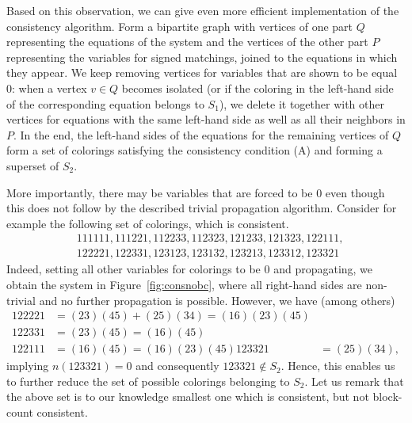 \documentclass[12pt,twoside,openright,a4paper]{book}
\begin{document}
Based on this observation, we can give even more efficient implementation of the consistency algorithm.
Form a bipartite graph with vertices of one part $Q$ representing the equations of the system
and the vertices of the other part $P$ representing the variables for signed matchings, joined
to the equations in which they appear.  We keep removing vertices for variables that are shown to be equal $0$:
when a vertex $v\in Q$ becomes isolated (or if the coloring in the left-hand side of the corresponding equation
belongs to $S_1$), we delete it together with other vertices for equations with the same left-hand side as well
as all their neighbors in $P$.  In the end, the left-hand sides of the equations for the remaining vertices of $Q$
form a set of colorings satisfying the consistency condition (A) and forming a superset of $S_2$.

More importantly, there may be variables that are forced to be $0$ even though this does not follow by the described
trivial propagation algorithm.  Consider for example the following set of colorings, which is consistent.
\begin{align*}
&111111,111221,112233,112323,121233,121323,122111,\\
&122221,122331,123123,123132,123213,123312,123321
\end{align*}
Indeed, setting all other variables for colorings to be $0$ and propagating, we obtain the system in Figure~\ref{fig:consnobc},
where all right-hand sides are non-trivial and no further propagation is possible.
However, we have (among others)
\begin{align*}
122221 &= (23)(45) + (25)(34) = (16)(23)(45)\\
122331 &= (23)(45) = (16)(45)\\
122111 &= (16)(45) = (16)(23)(45)
123321 &= (25)(34),
\end{align*}
implying $n(123321)=0$ and consequently $123321\not\in S_2$.  Hence, this enables us to further reduce the
set of possible colorings belonging to $S_2$.  Let us remark that the above set is to our knowledge smallest
one which is consistent, but not block-count consistent.
\end{document}

